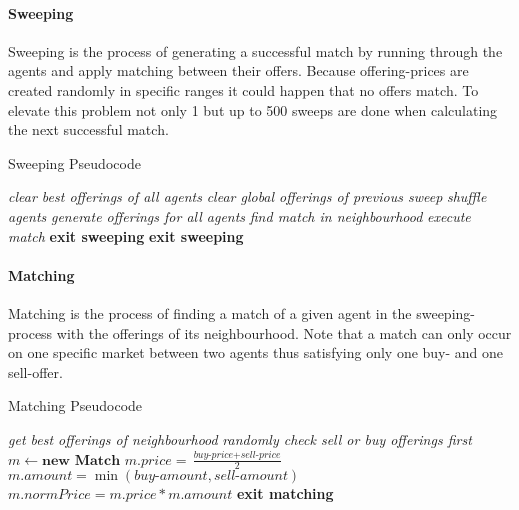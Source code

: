 \documentclass[Bachelorarbeit.tex]{subfiles}
\begin{document}
\paragraph{Sweeping}
Sweeping is the process of generating a successful match by running through the agents and apply matching between their offers. Because offering-prices are created randomly in specific ranges it could happen that no offers match. To elevate this problem not only 1 but up to 500 sweeps are done when calculating the next successful match.

\begin{algorithm}
\caption{Sweeping Pseudocode}\label{euclid}
\begin{algorithmic}[1]
\State \textit{clear best offerings of all agents}
	\State \textit{clear global offerings of previous sweep}
	\State \textit{shuffle agents}
	\State \textit{generate offerings for all agents}
		\State \textit{find match in neighbourhood}
			\State \textit{execute match}
			\State \textbf{exit sweeping}
		\EndIf 
	\EndFor
	\State \textbf{exit sweeping}
	\EndIf
\EndWhile
\end{algorithmic}
\end{algorithm}

\paragraph{Matching}
Matching is the process of finding a match of a given agent in the sweeping-process with the offerings of its neighbourhood. Note that a match can only occur on one specific market between two agents thus satisfying only one buy- and one sell-offer.

\begin{algorithm}
\caption{Matching Pseudocode}\label{euclid}
\begin{algorithmic}[1]
\State \textit{get best offerings of neighbourhood}
	\State \textit{randomly check sell or buy offerings first}
		\State $m \gets \textbf{new Match}$
		\State $m.price = \frac{\textit{buy-price} + \textit{sell-price}}{2}$
		\State $m.amount = \min(\textit{buy-amount}, \textit{sell-amount})$
		\State $m.normPrice = m.price * m.amount$
		\State \textbf{exit matching}
	\EndIf
\EndFor
\end{algorithmic}
\end{algorithm}
\end{document}
